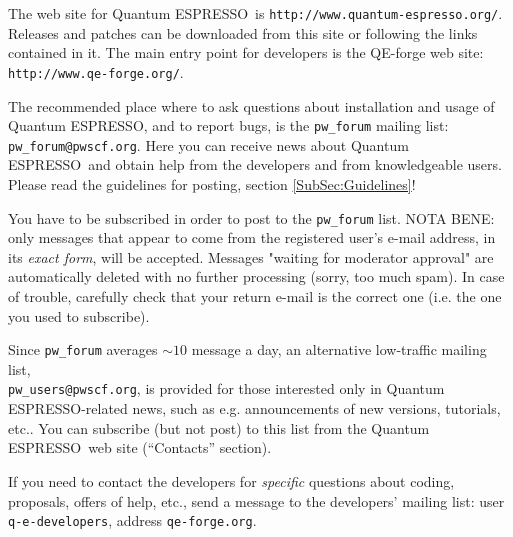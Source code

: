 \documentclass[12pt,a4paper]{article}
\def\qe{{\sc Quantum ESPRESSO}}
\begin{document}
The web site for \qe\ is \texttt{http://www.quantum-espresso.org/}.
Releases and patches can be downloaded from this
site or following the links contained in it. The main entry point for 
developers is the QE-forge web site:
\texttt{http://www.qe-forge.org/}.

The recommended place where to ask questions about installation 
and usage of \qe, and to report bugs, is the \texttt{pw\_forum} 
mailing list: \texttt{pw\_forum@pwscf.org}. Here you can receive
news about \qe\ and obtain help from the developers and from 
knowledgeable users. Please read the guidelines for posting,
section \ref{SubSec:Guidelines}!

You have to be subscribed in order to post to the  \texttt{pw\_forum}
list. NOTA BENE: only messages that appear to come from the 
registered user's e-mail address, in its {\em exact form}, will be
accepted. Messages "waiting for moderator approval" are
automatically deleted with no further processing (sorry, too 
much spam). In case of trouble, carefully check that your return 
e-mail is the correct one (i.e. the one you used to subscribe).

Since \texttt{pw\_forum} averages $\sim 10$ message a day, an alternative
low-traffic mailing list,\\
\texttt{pw\_users@pwscf.org}, is provided for
those interested only in \qe-related news, such as e.g. announcements 
of new versions, tutorials, etc.. You can subscribe (but not post) to 
this list from the \qe\ web site (``Contacts'' section).

If you need to contact the developers for {\em specific} questions 
about coding, proposals, offers of help, etc., send a message to the
developers' mailing list: user \texttt{q-e-developers}, address
\texttt{qe-forge.org}.
\end{document}
